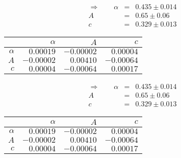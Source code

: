 \begin{align}\Rightarrow \qquad
    \alpha &=& 0.435 \pm 0.014 \\
    A &=& 0.65 \pm 0.06 \\
    c &=& 0.329 \pm 0.013 
\end{align}

 \begin{tabular}{|r|r|r|r|}
 \hline 
\cellcolor{tabcolor}&\cellcolor{tabcolor}$\alpha$&\cellcolor{tabcolor}$A$&\cellcolor{tabcolor}$c$\\ \hline 
 \cellcolor{tabcolor}$\alpha$&$0.00019$ &$-0.00002$ &$0.00004$ \\ \hline
\cellcolor{tabcolor}$A$&$-0.00002$ &$0.00410$ &$-0.00064$ \\ \hline
\cellcolor{tabcolor}$c$&$0.00004$ &$-0.00064$ &$0.00017$ \\ \hline
\end{tabular}
\begin{align}\Rightarrow \qquad
    \alpha &=& 0.435 \pm 0.014 \\
    A &=& 0.65 \pm 0.06 \\
    c &=& 0.329 \pm 0.013 
\end{align}

 \begin{tabular}{|r|r|r|r|}
 \hline 
\cellcolor{tabcolor}&\cellcolor{tabcolor}$\alpha$&\cellcolor{tabcolor}$A$&\cellcolor{tabcolor}$c$\\ \hline 
 \cellcolor{tabcolor}$\alpha$&$0.00019$ &$-0.00002$ &$0.00004$ \\ \hline
\cellcolor{tabcolor}$A$&$-0.00002$ &$0.00410$ &$-0.00064$ \\ \hline
\cellcolor{tabcolor}$c$&$0.00004$ &$-0.00064$ &$0.00017$ \\ \hline
\end{tabular}
